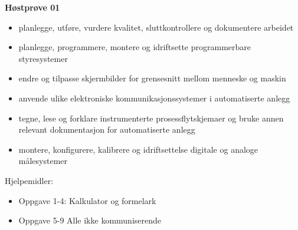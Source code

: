 
\begin{centering}
\Huge{\textbf{Høstprøve 01}}\\
\end{centering}
\vskip 2cm 
\begin{itemize}
	\item planlegge, utføre, vurdere kvalitet, sluttkontrollere og dokumentere arbeidet
	\item planlegge, programmere, montere og idriftsette programmerbare styresystemer
	\item endre og tilpasse skjermbilder for grensesnitt mellom menneske og maskin
	\item anvende ulike elektroniske kommunikasjonssystemer i automatiserte anlegg
	\item tegne, lese og forklare instrumenterte prosessflytskjemaer og bruke annen relevant dokumentasjon for automatiserte anlegg
	\item montere, konfigurere, kalibrere og idriftsettelse digitale og analoge målesystemer
\end{itemize}
\vskip 2.5pt 
Hjelpemidler:\begin{itemize}[noitemsep]
	\item Oppgave 1-4: Kalkulator og formelark
	\item Oppgave 5-9 Alle ikke kommuniserende
\end{itemize}

